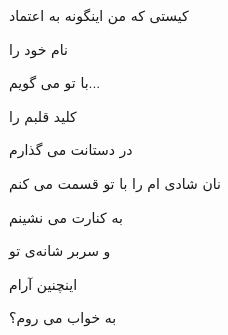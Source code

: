 \begin{acknowledgementpage}

\vspace{1.5cm}

{\nastaliq
{
کیستی که من
اینگونه به اعتماد

نام خود را

با تو می گویم...

کلید قلبم را

در دستانت می گذارم

نان شادی ام را با تو قسمت می کنم

به کنارت می نشینم

و سربر شانه‌ی تو

اینچنین آرام

به خواب می روم؟

}}\end{acknowledgementpage}
\newpage